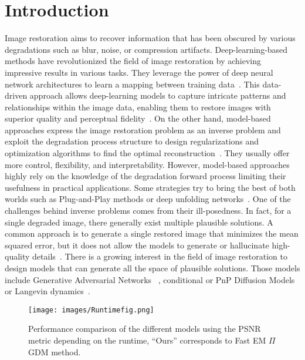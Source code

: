 \documentclass[10pt,twocolumn,letterpaper]{article}
\begin{document}
\section{Introduction}
%
%
Image restoration aims to recover information that has been obscured by various degradations such as blur, noise, or compression artifacts. 
%
Deep-learning-based methods have revolutionized the field of image restoration by achieving impressive results in various tasks. They leverage the power of deep neural network architectures to learn a mapping between training data~\cite{dong_learning_2014, zhang_beyond_2017, zhang_learning_2018}. This data-driven approach allows deep-learning models to capture intricate patterns and relationships within the image data, enabling them to restore images with superior quality and perceptual fidelity~\cite{zamir_multi-stage_2021, liang_swinir_2021}. 
%
On the other hand, model-based approaches express the image restoration problem as an inverse problem and exploit the degradation process structure to design regularizations and optimization algorithms to find the optimal reconstruction~\cite{perrone_total_2014}. They usually offer more control, flexibility, and interpretability. However, model-based approaches highly rely on the knowledge of the degradation forward process limiting their usefulness in practical applications. 
%
Some strategies try to bring the best of both worlds such as Plug-and-Play methods or deep unfolding networks~\cite{ryu_plug-and-play_2019, zhang_deep_2020, hurault2022, laroche_deep_2023, kamilov2023}.
%
One of the challenges behind inverse problems comes from their ill-posedness. In fact, for a single degraded image, there generally exist multiple plausible solutions. A common approach is to generate a single restored image that minimizes the mean squared error, but it does not allow the models to generate or hallucinate high-quality details~\cite{whang_deblurring_2022, saharia_image_2023}. There is a growing interest in the field of image restoration to design models that can generate all the space of plausible solutions. Those models include Generative Adversarial Networks~\cite{goodfellow_generative_2014, mirza2014conditional}
, conditional or PnP Diffusion Models~\cite{pmlr-v37-sohl-dickstein15, saharia_image_2023, kawar_denoising_2022} or Langevin dynamics~\cite{laumont2022langevin}. 
%
\begin{figure}[b]
    \vspace{-15pt}
    \centering
    \texttt{[image: images/Runtimefig.png]}
    \caption{Performance comparison of the different models using the PSNR metric depending on the runtime, ``Ours'' corresponds to Fast EM $\Pi$GDM method.
    }
    \label{fig:fid_on_runtime}
    \vspace{-5pt}
\end{figure}
\end{document}
